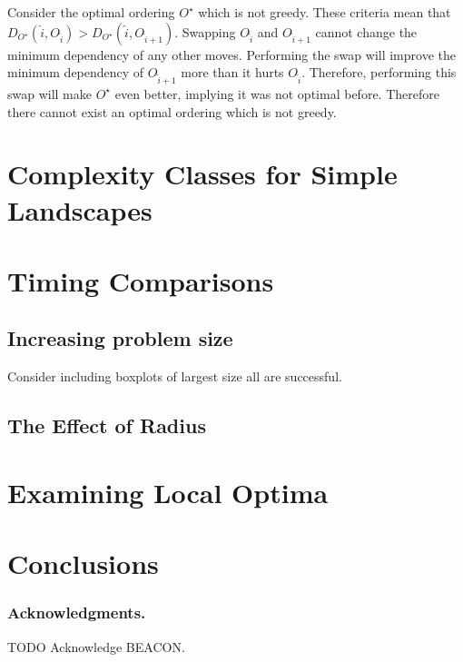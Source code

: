 \documentclass[runningheads,a4paper]{llncs}
\begin{document}
Consider the optimal ordering $O^\star$ which is not greedy.
These criteria mean that $D_{O^\star}(\hat{i}, O_{\hat{i}}) > D_{O^\star}(\hat{i}, O_{\hat{i}+1})$.
Swapping $O_{\hat{i}}$ and $O_{\hat{i}+1}$ cannot change the minimum dependency of any other moves.
Performing the swap will improve the minimum dependency of $O_{\hat{i}+1}$ more than it hurts
$O_{\hat{i}}$. Therefore, performing this swap will make $O^\star$ even better, implying it was
not optimal before. Therefore there cannot exist an optimal ordering which is not greedy.

\section{Complexity Classes for Simple Landscapes}

\section{Timing Comparisons}
\subsection{Increasing problem size}
Consider including boxplots of largest size all are successful.

\subsection{The Effect of Radius}

\section{Examining Local Optima}

\section{Conclusions}

\subsubsection*{Acknowledgments.} TODO Acknowledge BEACON.



\end{document}
